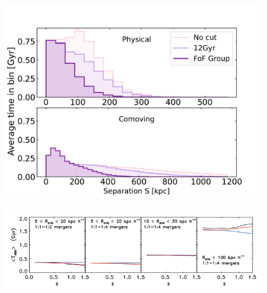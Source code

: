 \documentclass[twocolumn]{aastex631}
\begin{document}
\begin{figure}[htb]
    \centering
    \includegraphics[width=\columnwidth]{plots/4_timescales/timevssep_phys+co.pdf}
    \caption{}
\end{figure}

\begin{figure}[htb]
    \centering
    \includegraphics[width=\columnwidth]{lotz.png}
    \caption{}
\end{figure}







{}

\end{document}

